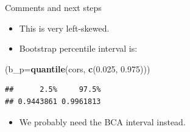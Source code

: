 \documentclass[
  ignorenonframetext,
]{beamer}
\newenvironment{Shaded}{\begin{snugshade}}{\end{snugshade}}
\newcommand{\DataTypeTok}[1]{\textcolor[rgb]{0.13,0.29,0.53}{#1}}
\newcommand{\FloatTok}[1]{\textcolor[rgb]{0.00,0.00,0.81}{#1}}
\newcommand{\KeywordTok}[1]{\textcolor[rgb]{0.13,0.29,0.53}{\textbf{#1}}}
\newcommand{\NormalTok}[1]{#1}
\providecommand{\tightlist}{%
  \setlength{\itemsep}{0pt}\setlength{\parskip}{0pt}}
\begin{document}
\begin{frame}[fragile]{Comments and next steps}
\protect\hypertarget{comments-and-next-steps-1}{}

\begin{itemize}
\tightlist
\item
  This is very left-skewed.
\item
  Bootstrap percentile interval is:
\end{itemize}

\begin{Shaded}
\begin{Highlighting}[]
\NormalTok{(}\DataTypeTok{b_p=}\KeywordTok{quantile}\NormalTok{(cors, }\KeywordTok{c}\NormalTok{(}\FloatTok{0.025}\NormalTok{, }\FloatTok{0.975}\NormalTok{)))}
\end{Highlighting}
\end{Shaded}

\begin{verbatim}
##      2.5%     97.5% 
## 0.9443861 0.9961813
\end{verbatim}

\begin{itemize}
\tightlist
\item
  We probably need the BCA interval instead.
\end{itemize}

\end{frame}
\end{document}
